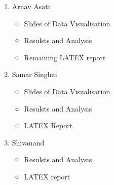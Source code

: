 \documentclass{article}
\begin{document}
\begin{enumerate}
\item Arnav Asati
\begin{itemize}
  \item Slides of Data Visualisation
  \item Resulsts and Analysis
  \item Remaining LATEX report
\end{itemize}
\item Samar Singhai 
\begin{itemize}
  \item Slides of Data Visualisation
  \item Resulsts and Analysis
  \item LATEX Report
\end{itemize}
\item Shivanand
\begin{itemize}
  \item Resulsts and Analysis
  \item LATEX report
\end{itemize}
\end{enumerate}
\end{document}
